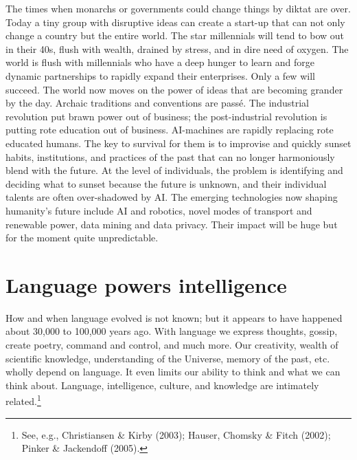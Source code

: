 \begin{multicols}{2}
The times when monarchs or governments could change things by diktat are over. Today a tiny group with disruptive ideas can create a start-up that can not only change a country but the entire world. The star millennials will tend to bow out in their 40s, flush with wealth, drained by stress, and in dire need of oxygen. The world is flush with millennials who have a deep hunger to learn and forge dynamic partnerships to rapidly expand their enterprises. Only a few will succeed. The world now moves on the power of ideas that are becoming grander by the day. Archaic traditions and conventions are passé. The industrial revolution put brawn power out of business; the post-industrial revolution is putting rote education out of business. AI-machines are rapidly replacing rote educated humans. The key to survival for them is to improvise and quickly sunset habits, institutions, and practices of the past that can no longer harmoniously blend with the future. At the level of individuals, the problem is identifying and deciding what to sunset because the future is unknown, and their individual talents are often over-shadowed by AI. The emerging technologies now shaping humanity's future include AI and robotics, novel modes of transport and renewable power, data mining and data privacy. Their impact will be huge but for the moment quite unpredictable.

\section{Language powers intelligence}

How and when language evolved is not known; but it appears to have happened about 30,000 to 100,000 years ago. With language we express thoughts, gossip, create poetry, command and control, and much more. Our creativity, wealth of scientific knowledge, understanding of the Universe, memory of the past, etc. wholly depend on language. It even limits our ability to think and what we can think about. Language, intelligence, culture, and knowledge are intimately related.\footnote{See, e.g., Christiansen \& Kirby (2003); Hauser, Chomsky \& Fitch (2002); Pinker \& Jackendoff (2005).}
\end{multicols}

